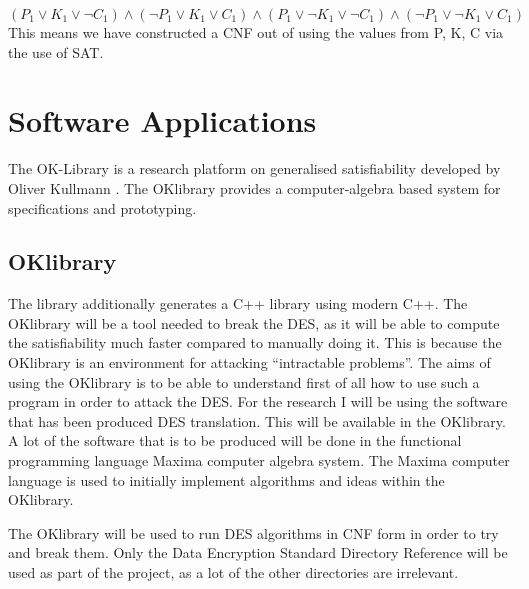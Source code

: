 \documentclass[11pt,a4paper]{report}
\begin{document}
\begin{displaymath}
(P_{1} \lor K_{1} \lor \neg C_{1}) \land (\neg P_{1} \lor K_{1} \lor C_{1}) \land (P_{1} \lor \neg K_{1} \lor \neg C_{1}) \land (\neg P_{1} \lor \neg K_{1} \lor C_{1})
\end{displaymath}
This means we have constructed a CNF out of using the values from P, K, C via the use of SAT. 






\chapter{Software Applications}
\label{cha:softApp}

The OK-Library is a research platform on generalised satisfiability developed by Oliver Kullmann \cite{Oliver2013OKlibrary}. The OKlibrary provides a computer-algebra based system for specifications and prototyping. 

\section{OKlibrary}
\label{sec:OKl}
The library additionally generates a C++ library using modern C++. 
The OKlibrary will be a tool needed to break the DES, as it will be able to compute the satisfiability much faster compared to manually doing it. This is because the OKlibrary is an environment for attacking “intractable problems”. The aims of using the OKlibrary is to be able to understand first of all how to use such a program in order to attack the DES. 
For the research I will be using the software that has been produced DES translation. This will be available in the OKlibrary. A lot of the software that is to be produced will be done in the functional programming language Maxima computer algebra system. The Maxima computer language is used to initially implement algorithms and ideas within the OKlibrary. 

The OKlibrary will be used to run DES algorithms in CNF form in order to try and break them. Only the Data Encryption Standard Directory Reference will be used as part of the project, as a lot of the other directories are irrelevant.
\end{document}
